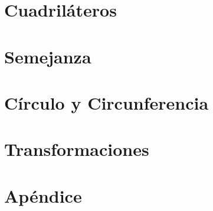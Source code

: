 \documentclass[12pt,titlepage]{article}
\theoremstyle{plain}
\theoremstyle{definition}
\theoremstyle{remark}
\begin{document}
\clearpage

\section{Cuadriláteros}


\clearpage

\section{Semejanza}


\clearpage

\section{Círculo y Circunferencia}


\section{Transformaciones}


\clearpage
\appendix

\section{Apéndice}

% 

%

% 
\end{document}
